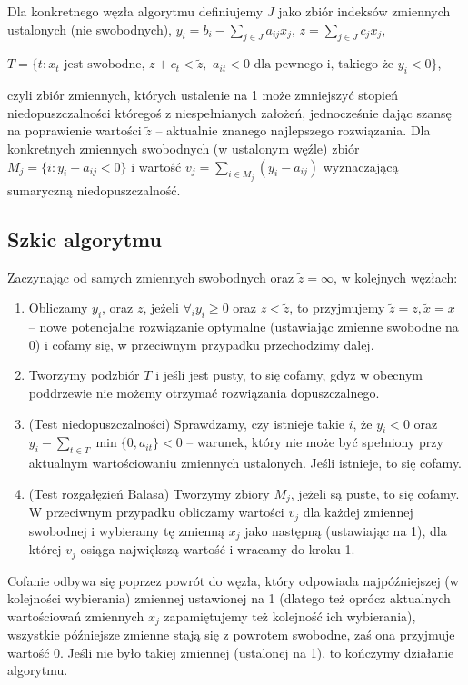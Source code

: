 \documentclass[licencjacka]{pracamgr}
\begin{document}
Dla konkretnego węzła algorytmu definiujemy $J$ jako zbiór indeksów zmiennych ustalonych (nie swobodnych), \quad $y_i=b_i-\sum\limits_{j\in J}a_{ij}x_j$, $z=\sum\limits_{j\in J}c_jx_j$,\newline
\centerline{$T=\{t:x_t\text{ jest swobodne, }z+c_t<\tilde{z},$ $a_{it}<0\text{ dla pewnego i, takiego że }y_i<0\}$,}\newline
czyli zbiór zmiennych, których ustalenie na 1
może zmniejszyć stopień niedopuszczalności któregoś z niespełnianych założeń, jednocześnie dając szansę na poprawienie wartości $\tilde{z}$ -- aktualnie znanego najlepszego rozwiązania.
Dla konkretnych zmiennych swobodnych (w ustalonym węźle) zbiór $M_j=\{i:y_i-a_{ij}<0\}$ i wartość $v_j=\sum\limits_{i\in M_j}(y_i-a_{ij})$ wyznaczającą sumaryczną niedopuszczalność.
%
    \subsection{Szkic algorytmu}
Zaczynając od samych zmiennych swobodnych oraz $\tilde{z}=\infty$, w kolejnych węzłach:
\begin{enumerate}
\item Obliczamy $y_i$, oraz $z$, jeżeli $\forall_{i}y_i\ge0$ oraz $z<\tilde{z}$, to przyjmujemy $\tilde{z}=z,\tilde{x}=x$ --
nowe potencjalne rozwiązanie optymalne (ustawiając zmienne swobodne na 0) i cofamy się, w przeciwnym przypadku przechodzimy dalej.
%
\item Tworzymy podzbiór $T$ i jeśli jest pusty, to się cofamy, gdyż w obecnym poddrzewie nie możemy otrzymać rozwiązania dopuszczalnego.
%
\item (Test niedopuszczalności)\newline
Sprawdzamy, czy istnieje takie $i$, że $y_i<0$ oraz $y_i-\sum\limits_{t\in T}\min{\{0,a_{it}\}}<0$ --
warunek, który nie może być spełniony przy aktualnym wartościowaniu zmiennych ustalonych. Jeśli istnieje, to się cofamy.
%
\item (Test rozgałęzień Balasa)\newline
Tworzymy zbiory $M_j$, jeżeli są puste, to się cofamy. W przeciwnym przypadku obliczamy wartości $v_j$ dla każdej zmiennej swobodnej i
wybieramy tę zmienną $x_j$ jako następną (ustawiając na 1), dla której $v_j$ osiąga największą wartość i wracamy do kroku 1.
\end{enumerate}

Cofanie odbywa się poprzez powrót do węzła, który odpowiada najpóźniejszej (w kolejności wybierania) zmiennej ustawionej na 1
(dlatego też oprócz aktualnych wartościowań zmiennych $x_j$ zapamiętujemy też kolejność ich wybierania), wszystkie późniejsze zmienne stają się z powrotem swobodne,
zaś ona przyjmuje wartość 0. Jeśli nie było takiej zmiennej (ustalonej na 1), to kończymy działanie algorytmu.\newline
%
\end{document}
